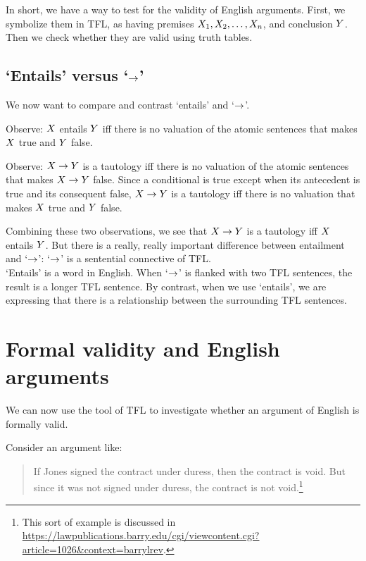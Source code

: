 In short, we have a way to test for the validity of English arguments. First, we symbolize them in TFL, as having premises $X_1, X_2, \ldots, X_n$, and conclusion $Y$. Then we check whether they are valid using truth tables. 


\subsection{`Entails' versus `$\rightarrow$'}
We now want to compare and contrast `entails' and `$\rightarrow$'.

Observe: $X$ entails $Y$ iff there is no valuation of the atomic sentences that makes $X$ true and $Y$ false.

Observe: $X \rightarrow Y$ is a tautology iff there is no valuation of the atomic sentences that makes $X \rightarrow Y$ false. Since a conditional is true except when its antecedent is true and its consequent false, $X \rightarrow Y$ is a tautology iff there is no valuation that makes $X$ true and $Y$ false.

Combining these two observations, we see that $X \rightarrow Y$  is a tautology iff  $X$ entails $Y$. But there is a really, really important difference between entailment and `$\rightarrow$': `$\rightarrow$' is a sentential connective of TFL.\\ `Entails' is a word in English. 
When `$\rightarrow$' is flanked with two TFL sentences, the result is a longer TFL sentence. By contrast, when we use `entails', we are expressing that there is a relationship between the surrounding TFL sentences.



\section{Formal validity and English arguments}\label{s:TFLvsEngl}

We can now use the tool of TFL to investigate whether an argument of English is formally valid.

Consider an argument like:
\begin{quote}
If Jones signed the contract under duress, then the contract is void. But since it was not signed under duress, the contract is not void.\footnote{
This sort of example is discussed in \url{https://lawpublications.barry.edu/cgi/viewcontent.cgi?article=1026&context=barrylrev}.}
\end{quote}

